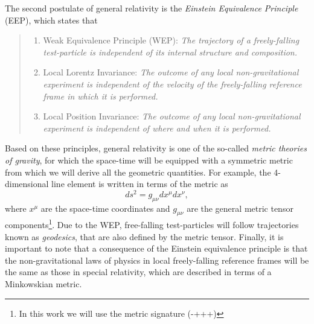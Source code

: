 The second postulate of general relativity is the \textit{Einstein Equivalence Principle} (EEP), which states that
\begin{quote}
\begin{enumerate}
\item Weak Equivalence Principle (WEP): \textit{The trajectory of a freely-falling test-particle is independent of its internal structure and composition.}
\item Local Lorentz Invariance: \textit{The outcome of any local non-gravitational experiment is independent of the velocity of the freely-falling reference frame in which it is performed.}
\item Local Position Invariance: \textit{The outcome of any local non-gravitational experiment is independent of where and when it is performed.}  
\end{enumerate}
\end{quote}

Based on these principles, general relativity is one of the so-called \textit{metric theories of gravity}, for which the space-time will be equipped with a symmetric metric from which we will derive all the geometric quantities. For example, the 4-dimensional line element is written in terms of the metric as
\begin{equation}
 ds^2 = g_{\mu \nu} dx^\mu dx^\nu,
\end{equation} 
where $x^\mu$ are the space-time coordinates and $g_{\mu \nu}$ are the general metric tensor components\footnote{In this work we will use the metric signature (-+++)}. Due to the WEP,  free-falling test-particles will follow trajectories known as \textit{geodesics}, that are also defined by the metric tensor. Finally, it is important to note that a consequence of the Einstein equivalence principle is that the non-gravitational laws of physics in local freely-falling reference frames will be the same as those in special relativity, which are described in terms of a Minkowskian metric.


